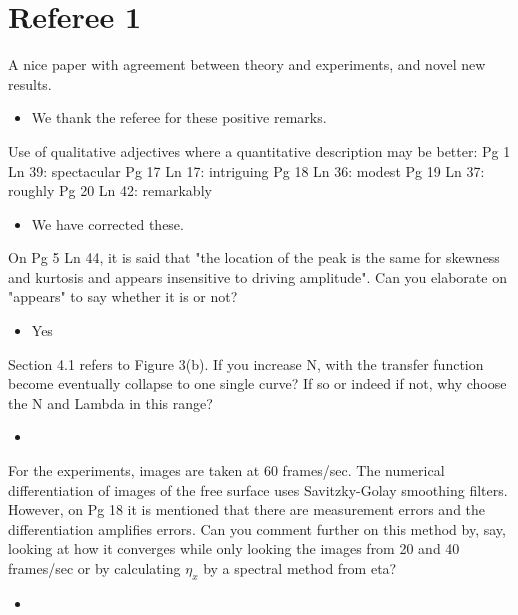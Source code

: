 \documentclass[11pt]{article}
\newcommand{\comment}[1]{{\color{blue} #1}}
\begin{document}
\section*{Referee 1}

\noindent
\comment{A nice paper with agreement between theory and experiments, and novel new results.
}
\begin{itemize}
\item We thank the referee for these positive remarks.
\end{itemize}

\noindent
\comment{
Use of qualitative adjectives where a quantitative description may be better:
Pg 1 Ln 39: spectacular
Pg 17 Ln 17: intriguing
Pg 18 Ln 36: modest
Pg 19 Ln 37: roughly
Pg 20 Ln 42: remarkably}

\begin{itemize}
\item We have corrected these.
\end{itemize}

\noindent
\comment{On Pg 5 Ln 44, it is said that "the location of the peak is the same for skewness and kurtosis and appears insensitive to driving amplitude". Can you elaborate on "appears" to say whether it is or not?}

\begin{itemize}
\item Yes
\end{itemize}

\noindent
\comment{Section 4.1 refers to Figure 3(b). If you increase N, with the transfer function become eventually collapse to one single curve? If so or indeed if not, why choose the N and Lambda in this range?}

\begin{itemize}
\item
\end{itemize}

\noindent
\comment{For the experiments, images are taken at 60 frames/sec. The numerical differentiation of images of the free surface uses Savitzky-Golay smoothing filters. However, on Pg 18 it is mentioned that there are measurement errors and the differentiation amplifies errors. Can you comment further on this method by, say, looking at how it converges while only looking the images from 20 and 40 frames/sec or by calculating $\eta_x$ by a spectral method from eta? }

\begin{itemize}
\item
\end{itemize}
\end{document}
